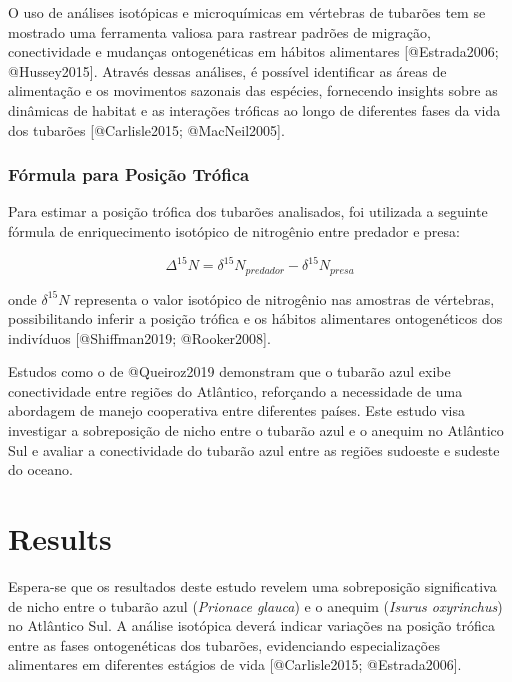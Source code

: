\documentclass[
  utf8]{FrontiersinHarvard}
\begin{document}
O uso de análises isotópicas e microquímicas em vértebras de tubarões
tem se mostrado uma ferramenta valiosa para rastrear padrões de
migração, conectividade e mudanças ontogenéticas em hábitos alimentares
{[}@Estrada2006; @Hussey2015{]}. Através dessas análises, é possível
identificar as áreas de alimentação e os movimentos sazonais das
espécies, fornecendo insights sobre as dinâmicas de habitat e as
interações tróficas ao longo de diferentes fases da vida dos tubarões
{[}@Carlisle2015; @MacNeil2005{]}.

\subsubsection*{Fórmula para Posição
Trófica}\label{fuxf3rmula-para-posiuxe7uxe3o-truxf3fica}

Para estimar a posição trófica dos tubarões analisados, foi utilizada a
seguinte fórmula de enriquecimento isotópico de nitrogênio entre
predador e presa:

\[
\Delta^{15}N = \delta^{15}N_{predador} - \delta^{15}N_{presa}
\]

onde \(\delta^{15}N\) representa o valor isotópico de nitrogênio nas
amostras de vértebras, possibilitando inferir a posição trófica e os
hábitos alimentares ontogenéticos dos indivíduos {[}@Shiffman2019;
@Rooker2008{]}.

Estudos como o de @Queiroz2019 demonstram que o tubarão azul exibe
conectividade entre regiões do Atlântico, reforçando a necessidade de
uma abordagem de manejo cooperativa entre diferentes países. Este estudo
visa investigar a sobreposição de nicho entre o tubarão azul e o anequim
no Atlântico Sul e avaliar a conectividade do tubarão azul entre as
regiões sudoeste e sudeste do oceano.

\section*{Results}\label{results}

Espera-se que os resultados deste estudo revelem uma sobreposição
significativa de nicho entre o tubarão azul (\emph{Prionace glauca}) e o
anequim (\emph{Isurus oxyrinchus}) no Atlântico Sul. A análise isotópica
deverá indicar variações na posição trófica entre as fases ontogenéticas
dos tubarões, evidenciando especializações alimentares em diferentes
estágios de vida {[}@Carlisle2015; @Estrada2006{]}.
\end{document}
